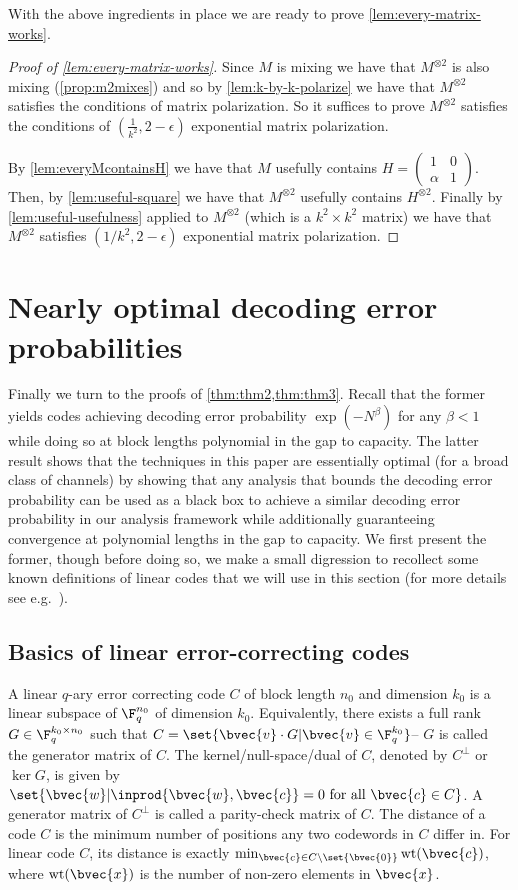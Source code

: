 \documentclass[11pt]{article}
\newcommand{\HadMat}{\left(\begin{smallmatrix} 1 & 0 \\ \alpha & 1 \end{smallmatrix}\right)}
\newcommand{\wt}{\mathop\mathrm{wt}}
\begin{document}
With the above ingredients in place we are ready to prove \cref{lem:every-matrix-works}.

\begin{proof}[Proof of \cref{lem:every-matrix-works}]
	Since $M$ is mixing we have that $M^{\otimes 2}$ is also mixing (\cref{prop:m2mixes}) and so by \cref{lem:k-by-k-polarize} we have that $M^{\otimes 2}$ satisfies the conditions of matrix polarization. So it suffices to prove $M^{\otimes 2}$ satisfies the conditions of $(\frac{1}{k^2},2-\epsilon)$ exponential matrix polarization. 
	
	By \cref{lem:everyMcontainsH} we have that $M$ usefully contains $H=\HadMat$. Then, by \cref{lem:useful-square} we have that $M^{\otimes 2}$ usefully contains $H^{\otimes 2}$. Finally by \cref{lem:useful-usefulness} applied to $M^{\otimes 2}$ (which is a $k^2 \times k^2$ matrix) we have that $M^{\otimes 2}$ satisfies $(1/k^2,2-\epsilon)$ exponential matrix polarization. 
\end{proof}

\section{Nearly optimal decoding error probabilities \label{sec:lift}}

Finally we turn to the proofs of \cref{thm:thm2,thm:thm3}. Recall that the former yields codes achieving decoding error probability $\exp(-N^{\beta})$ for any $\beta<1$ while doing so at block lengths polynomial in the gap to capacity. The latter result shows that the techniques in this paper are essentially optimal (for a broad class of channels) by showing that any analysis that bounds the decoding error probability can be used as a black box to achieve a similar decoding error probability in our analysis framework while additionally guaranteeing convergence at polynomial lengths in the gap to capacity. 
We first present the former, though before doing so, we make a small digression to recollect some known definitions of linear codes that we will use in this section (for more details see e.g.~\cite[Chap. 2]{essential-coding}).

\subsection{Basics of linear error-correcting codes}

A linear $q$-ary error correcting code $C$ of block length $n_0$ and dimension $k_0$ is a linear subspace of $\F_q^{n_0}$ of dimension $k_0$. Equivalently, there exists a full rank $G\in\F_q^{k_0\times n_0}$ such that $C=\set{\bvec{v}\cdot G|\bvec{v}\in\F_q^{k_0}}$-- $G$ is called the generator matrix of $C$. The kernel/null-space/dual of $C$, denoted by $C^{\perp}$ or $\ker G$, is given by $\set{\bvec{w}| \inprod{\bvec{w},\bvec{c}}=0\text{ for all }\bvec{c}\in C}$. A generator matrix of $C^{\perp}$ is called a parity-check matrix of $C$. The distance of a code $C$ is the minimum number of positions any two codewords in $C$ differ in. For linear code $C$, its distance is exactly $\min_{\bvec{c}\in C\setminus \set{\bvec{0}}} \wt(\bvec{c})$, where $\wt(\bvec{x})$ is the number of non-zero elements in $\bvec{x}$.
\end{document}

